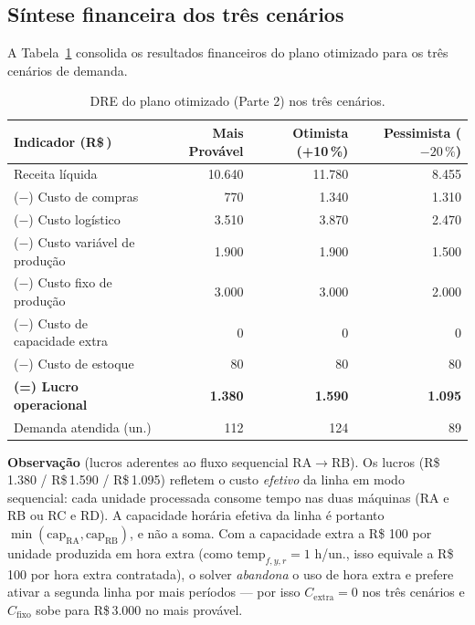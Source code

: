 \documentclass[11pt,a4paper]{article}
\newcommand{\rs}{R\$\,}
\begin{document}
\subsection{Síntese financeira dos três cenários}

A Tabela~\ref{tab:dre-p2} consolida os resultados financeiros do plano otimizado para os três cenários de demanda.

\begin{table}[h]
\centering
\caption{DRE do plano otimizado (Parte 2) nos três cenários.}
\label{tab:dre-p2}
\begin{tabular}{lrrr}
\toprule
\textbf{Indicador (\rs)} & \textbf{Mais Provável} & \textbf{Otimista (+10\,\%)} & \textbf{Pessimista ($-20\,\%$)} \\
\midrule
Receita líquida                 & 10.640 & 11.780 & 8.455 \\
($-$) Custo de compras          & 770    & 1.340  & 1.310 \\
($-$) Custo logístico           & 3.510  & 3.870  & 2.470 \\
($-$) Custo variável de produção& 1.900  & 1.900  & 1.500 \\
($-$) Custo fixo de produção    & 3.000  & 3.000  & 2.000 \\
($-$) Custo de capacidade extra & 0      & 0      & 0     \\
($-$) Custo de estoque          & 80     & 80     & 80    \\
\textbf{(=) Lucro operacional}  & \textbf{1.380} & \textbf{1.590} & \textbf{1.095} \\
Demanda atendida (un.)          & 112    & 124    & 89    \\
\bottomrule
\end{tabular}
\end{table}

\noindent\textbf{Observação} (lucros aderentes ao fluxo sequencial RA$\to$RB). Os lucros (\rs1.380 / \rs1.590 / \rs1.095) refletem o custo \emph{efetivo} da linha em modo sequencial: cada unidade processada consome tempo nas duas máquinas (RA e RB ou RC e RD). A capacidade horária efetiva da linha é portanto $\min(\text{cap}_{\text{RA}}, \text{cap}_{\text{RB}})$, e não a soma. Com a capacidade extra a R\$ 100 por unidade produzida em hora extra (como $\text{temp}_{f,y,r} = 1$ h/un., isso equivale a R\$ 100 por hora extra contratada), o solver \emph{abandona} o uso de hora extra e prefere ativar a segunda linha por mais períodos --- por isso $C_{\text{extra}} = 0$ nos três cenários e $C_{\text{fixo}}$ sobe para \rs3.000 no mais provável.
\end{document}
